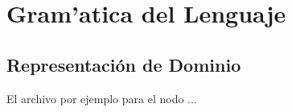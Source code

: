 \chapter{Gram'atica del Lenguaje}

\section {Representación de Dominio}

El archivo por ejemplo para el nodo ...
